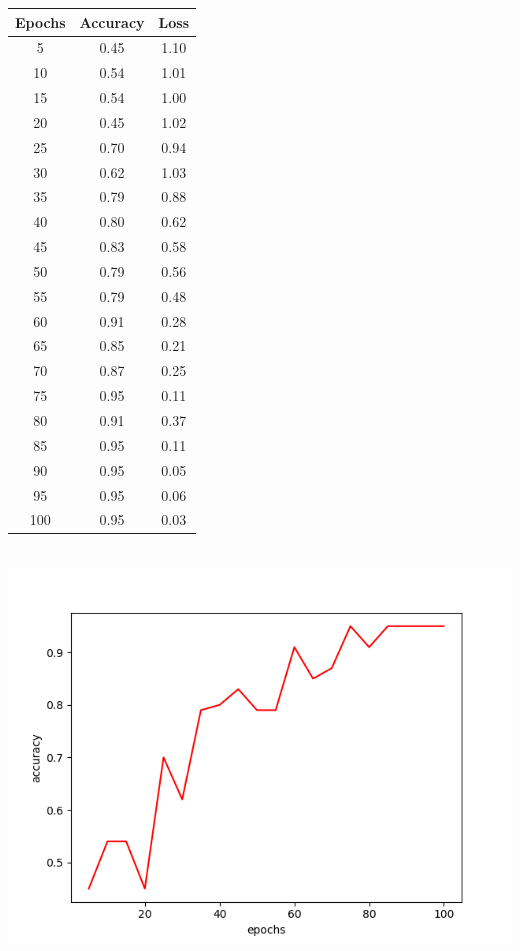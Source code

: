 \documentclass[a4papaer,12pt]{article}
\begin{document}
\begin{tabular}{|c|c|c|}
	\hline
	Epochs & Accuracy & Loss \\
	\hline
	5 & 0.45 & 1.10 \\
	\hline
	10 & 0.54 & 1.01 \\
	\hline
	15 & 0.54 & 1.00 \\
	\hline
	20 & 0.45 & 1.02 \\	
	\hline
	25 & 0.70 & 0.94 \\
	\hline
	30 & 0.62 & 1.03 \\	
	\hline
	35 & 0.79 & 0.88 \\
	\hline
	40 & 0.80 & 0.62 \\	
	\hline
	45 & 0.83 & 0.58 \\
	\hline
	50 & 0.79 & 0.56 \\	
	\hline
	55 & 0.79 & 0.48 \\
	\hline
	60 & 0.91 & 0.28 \\	
	\hline
	65 & 0.85 & 0.21 \\
	\hline
	70 & 0.87 & 0.25 \\	
	\hline
	75 & 0.95 & 0.11 \\
	\hline
	80 & 0.91 & 0.37 \\	
	\hline
	85 & 0.95 & 0.11 \\
	\hline
	90 & 0.95 & 0.05 \\	
	\hline
	95 & 0.95 & 0.06 \\
	\hline
	100 & 0.95 & 0.03 \\	
	\hline
\end{tabular}
\\
\includegraphics[scale=0.5]{Accuracy-Epochs.png}
\end{document}
